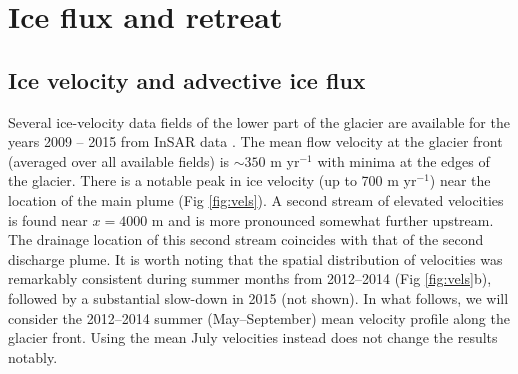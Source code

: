 \documentclass[30pt,letterpaper]{article}
\begin{document}
\section{Ice flux and retreat}

\subsection{Ice velocity and advective ice flux} \label{vels}

Several ice-velocity data fields of the lower part of the glacier are available for the years 2009 -- 2015 from InSAR data \citep{Joughin:uFAgCs4K}. The mean flow velocity at the glacier front (averaged over all available fields) is $\sim 350$ m yr$^{-1}$ with minima at the edges of the glacier. There is a notable peak in ice velocity (up to 700 m yr$^{-1}$) near the location of the main plume (Fig \ref{fig:vels}). A second stream of elevated velocities is found near $x = 4000$ m and is more pronounced somewhat further upstream. The drainage location of this second stream coincides with that of the second discharge plume. It is worth noting that the spatial distribution of velocities was remarkably consistent during summer months from 2012--2014 (Fig  \ref{fig:vels}b), followed by a substantial slow-down in 2015 (not shown). In what follows, we will consider the 2012--2014 summer (May--September) mean velocity profile along the glacier front. Using the mean July velocities instead does not change the results notably. 

\end{document}
